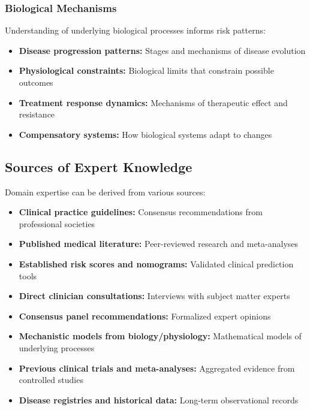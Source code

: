 \subsubsection{Biological Mechanisms}

Understanding of underlying biological processes informs risk patterns:

\begin{itemize}
    \item \textbf{Disease progression patterns:} Stages and mechanisms of disease evolution
    \item \textbf{Physiological constraints:} Biological limits that constrain possible outcomes
    \item \textbf{Treatment response dynamics:} Mechanisms of therapeutic effect and resistance
    \item \textbf{Compensatory systems:} How biological systems adapt to changes
\end{itemize}

\subsection{Sources of Expert Knowledge}

Domain expertise can be derived from various sources:

\begin{itemize}
    \item \textbf{Clinical practice guidelines:} Consensus recommendations from professional societies
    \item \textbf{Published medical literature:} Peer-reviewed research and meta-analyses
    \item \textbf{Established risk scores and nomograms:} Validated clinical prediction tools
    \item \textbf{Direct clinician consultations:} Interviews with subject matter experts
    \item \textbf{Consensus panel recommendations:} Formalized expert opinions
    \item \textbf{Mechanistic models from biology/physiology:} Mathematical models of underlying processes
    \item \textbf{Previous clinical trials and meta-analyses:} Aggregated evidence from controlled studies
    \item \textbf{Disease registries and historical data:} Long-term observational records
\end{itemize}

